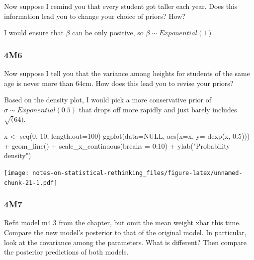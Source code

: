 \documentclass[
]{book}
\newenvironment{Shaded}{\begin{snugshade}}{\end{snugshade}}
\newcommand{\AttributeTok}[1]{\textcolor[rgb]{0.77,0.63,0.00}{#1}}
\newcommand{\ConstantTok}[1]{\textcolor[rgb]{0.00,0.00,0.00}{#1}}
\newcommand{\DecValTok}[1]{\textcolor[rgb]{0.00,0.00,0.81}{#1}}
\newcommand{\FloatTok}[1]{\textcolor[rgb]{0.00,0.00,0.81}{#1}}
\newcommand{\FunctionTok}[1]{\textcolor[rgb]{0.00,0.00,0.00}{#1}}
\newcommand{\NormalTok}[1]{#1}
\newcommand{\OtherTok}[1]{\textcolor[rgb]{0.56,0.35,0.01}{#1}}
\newcommand{\SpecialCharTok}[1]{\textcolor[rgb]{0.00,0.00,0.00}{#1}}
\newcommand{\StringTok}[1]{\textcolor[rgb]{0.31,0.60,0.02}{#1}}
\begin{document}
Now suppose I remind you that every student got taller each year. Does this information lead you to change your choice of priors? How?

I would ensure that \(\beta\) can be only positive, so \(β ∼ Exponential(1)\).

\hypertarget{m6-2}{%
\subsubsection*{4M6}\label{m6-2}}

Now suppose I tell you that the variance among heights for students of the same age is never more than 64cm. How does this lead you to revise your priors?

Based on the density plot, I would pick a more conservative prior of \(\sigma \sim Exponential(0.5)\) that drops off more rapidly and just barely includes \(\sqrt(64)\).

\begin{Shaded}
\begin{Highlighting}[]
\NormalTok{x }\OtherTok{\textless{}{-}} \FunctionTok{seq}\NormalTok{(}\DecValTok{0}\NormalTok{, }\DecValTok{10}\NormalTok{, }\AttributeTok{length.out=}\DecValTok{100}\NormalTok{)}
\FunctionTok{ggplot}\NormalTok{(}\AttributeTok{data=}\ConstantTok{NULL}\NormalTok{, }\FunctionTok{aes}\NormalTok{(}\AttributeTok{x=}\NormalTok{x, }\AttributeTok{y=} \FunctionTok{dexp}\NormalTok{(x, }\FloatTok{0.5}\NormalTok{))) }\SpecialCharTok{+} 
  \FunctionTok{geom\_line}\NormalTok{() }\SpecialCharTok{+}
  \FunctionTok{scale\_x\_continuous}\NormalTok{(}\AttributeTok{breaks =} \DecValTok{0}\SpecialCharTok{:}\DecValTok{10}\NormalTok{) }\SpecialCharTok{+}
  \FunctionTok{ylab}\NormalTok{(}\StringTok{"Probability density"}\NormalTok{)}
\end{Highlighting}
\end{Shaded}

\texttt{[image: notes-on-statistical-rethinking\_files/figure-latex/unnamed-chunk-21-1.pdf]}

\hypertarget{m7-1}{%
\subsubsection*{4M7}\label{m7-1}}

Refit model m4.3 from the chapter, but omit the mean weight xbar this time. Compare the new model's posterior to that of the original model. In particular, look at the covariance among the parameters. What is different? Then compare the posterior predictions of both models.
\end{document}
